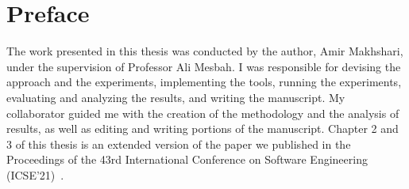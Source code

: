 
\chapter{Preface}

The work presented in this thesis was conducted by the author, Amir Makhshari, under the supervision of Professor Ali Mesbah. I was responsible for devising the approach and the experiments, implementing the tools, running the experiments, evaluating and analyzing the results, and writing the manuscript. My collaborator guided me with the creation of the methodology and the analysis of results, as well as editing and writing portions of the manuscript. Chapter 2 and 3 of this thesis is an extended version of the paper we published in the Proceedings of the 43rd International Conference on Software Engineering (ICSE'21)~\cite{makhshari2021iot}.
